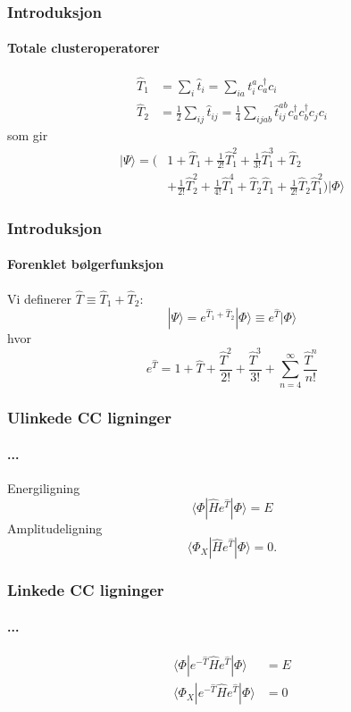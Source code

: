 \documentclass[norsk,a4paper,12pt]{beamer}
\begin{document}
  \begin{frame}
    \frametitle{Introduksjon}
    \framesubtitle{Totale clusteroperatorer}
    \begin{align*}
    \hat{T}_1&=\sum_i\hat{t}_i=\sum_{ia}t_i^ac_a^{\dagger}c_i\\
    \hat{T}_2&=\frac{1}{2}\sum_{ij}\hat{t}_{ij}=\frac{1}{4}\sum_{ijab}\hat{t}_{ij}^{ab}c_a^{\dagger}c_b^{\dagger}c_jc_i
    \end{align*}
    som gir
    \begin{align*}
    |\Psi\rangle=\bigg(&1+\hat{T}_1+\frac{1}{2!}\hat{T}_1^2+\frac{1}{3!}\hat{T}_1^3+\hat{T}_2\\
    &+\frac{1}{2!}\hat{T}_2^2+\frac{1}{4!}\hat{T}_1^4+\hat{T}_2\hat{T}_1+\frac{1}{2!}\hat{T}_2\hat{T}_1^2\bigg)|\Phi\rangle
    \end{align*}
  \end{frame}
  \begin{frame}
    \frametitle{Introduksjon}
    \framesubtitle{Forenklet bølgerfunksjon}
    Vi definerer $\hat{T}\equiv\hat{T}_1+\hat{T}_2$:
    \begin{equation}
    |\Psi\rangle=e^{\hat{T}_1+\hat{T}_2}|\Phi\rangle\equiv e^{\hat{T}}|\Phi\rangle
    \end{equation}
    hvor
    \begin{equation}
    e^{\hat{T}}=1+\hat{T}+\frac{\hat{T}^2}{2!}+\frac{\hat{T}^3}{3!}+\sum_{n=4}^{\infty}\frac{\hat{T}^n}{n!}
    \end{equation}
  \end{frame}
  \begin{frame}
    \frametitle{Ulinkede CC ligninger}
    \framesubtitle{...}
    Energiligning
    \begin{equation}
    \langle\Phi|\hat{H}e^{\hat{T}}|\Phi\rangle=E
    \end{equation}
    Amplitudeligning
    \begin{equation}
    \langle\Phi_X|\hat{H}e^{\hat{T}}|\Phi\rangle=0.
    \end{equation}
    
  \end{frame}
  \begin{frame}
    \frametitle{Linkede CC ligninger}
    \framesubtitle{...}
    
    \begin{align}
    \langle\Phi|e^{-\hat{T}}\hat{H}e^{\hat{T}}|\Phi\rangle&=E\\
    \langle\Phi_X|e^{-\hat{T}}\hat{H}e^{\hat{T}}|\Phi\rangle&=0
    \end{align}

  \end{frame}
\end{document}
